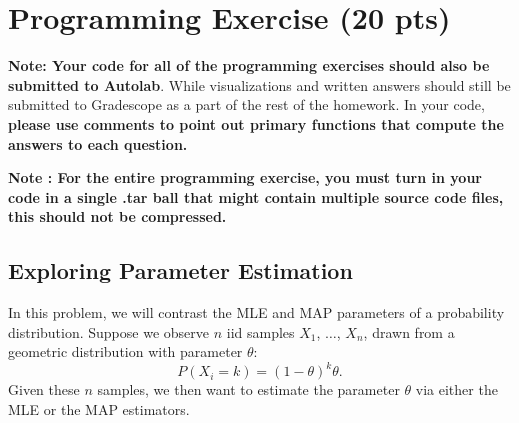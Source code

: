 \documentclass{article}
\begin{document}
\newpage

\section{Programming Exercise (20 pts)}%

\textbf{Note: Your code for all of the programming exercises should also be submitted to Autolab}. While visualizations and written answers should still be submitted to Gradescope as a part of the rest of the homework. In your code, \textbf{please use comments to point out primary functions that compute the answers to each question.} 

\textbf{Note : For the entire programming exercise, you must turn in your code in a single .tar ball that might contain multiple source code files, this should not be compressed.}
\subsection*{Exploring Parameter Estimation}
In this problem, we will contrast the MLE and MAP parameters of a probability distribution. Suppose we observe $n$ iid samples $X_1$, $\ldots$, $X_n$, drawn from a geometric distribution with parameter $\theta$:
$$P(X_i = k) = (1 - \theta)^k \theta.$$
Given these $n$ samples, we then want to estimate the parameter $\theta$ via either the MLE or the MAP estimators.
\end{document}
